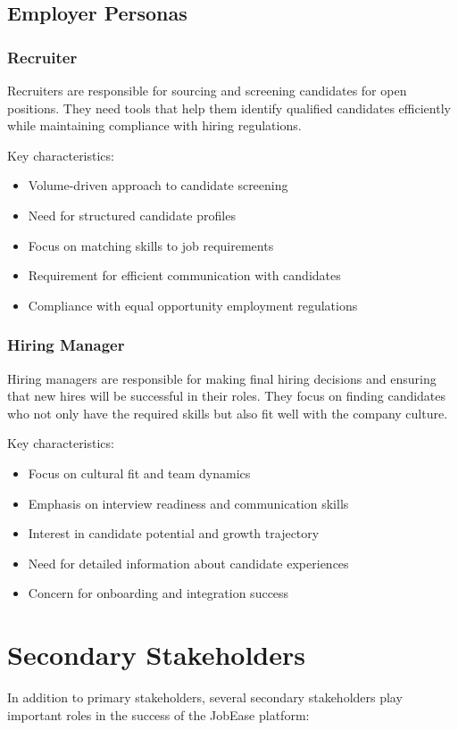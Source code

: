 \documentclass[12pt,a4paper]{report}
\begin{document}
\subsection{Employer Personas}
\subsubsection{Recruiter}
Recruiters are responsible for sourcing and screening candidates for open positions. They need tools that help them identify qualified candidates efficiently while maintaining compliance with hiring regulations.

Key characteristics:
\begin{itemize}[leftmargin=2em]
  \item Volume-driven approach to candidate screening
  \item Need for structured candidate profiles
  \item Focus on matching skills to job requirements
  \item Requirement for efficient communication with candidates
  \item Compliance with equal opportunity employment regulations
\end{itemize}

\subsubsection{Hiring Manager}
Hiring managers are responsible for making final hiring decisions and ensuring that new hires will be successful in their roles. They focus on finding candidates who not only have the required skills but also fit well with the company culture.

Key characteristics:
\begin{itemize}[leftmargin=2em]
  \item Focus on cultural fit and team dynamics
  \item Emphasis on interview readiness and communication skills
  \item Interest in candidate potential and growth trajectory
  \item Need for detailed information about candidate experiences
  \item Concern for onboarding and integration success
\end{itemize}

\section{Secondary Stakeholders}
In addition to primary stakeholders, several secondary stakeholders play important roles in the success of the JobEase platform:
\end{document}
